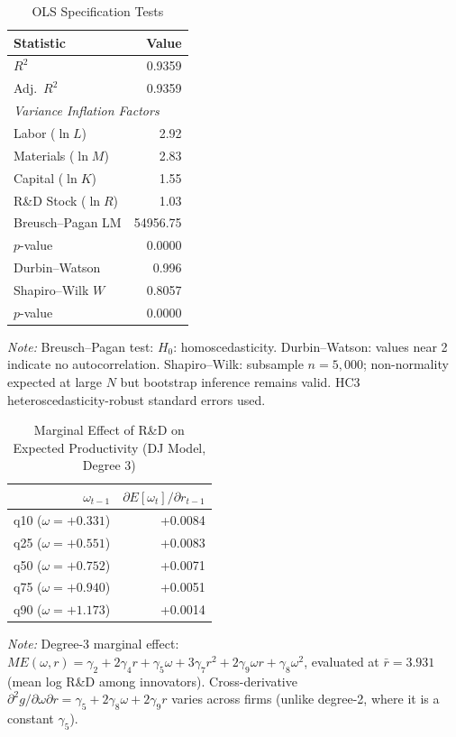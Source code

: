 \documentclass[a4paper, 12pt]{article}
\begin{document}
\begin{table}[htbp]
\centering
\caption{OLS Specification Tests}
\label{tab:ols_diagnostics}
\begin{tabular}{lr}
\toprule
Statistic & Value \\
\midrule
  $R^2$               & 0.9359 \\
  Adj.\ $R^2$         & 0.9359 \\
  \midrule
  \multicolumn{2}{l}{\textit{Variance Inflation Factors}} \\
  \quad Labor ($\ln L$) & 2.92 \\
  \quad Materials ($\ln M$) & 2.83 \\
  \quad Capital ($\ln K$) & 1.55 \\
  \quad R\&D Stock ($\ln R$) & 1.03 \\
  \midrule
  Breusch--Pagan LM & 54956.75 \\
  \quad $p$-value    & 0.0000 \\
  Durbin--Watson      & 0.996 \\
  Shapiro--Wilk $W$  & 0.8057 \\
  \quad $p$-value    & 0.0000 \\
\bottomrule
\end{tabular}
\begin{flushleft}
\footnotesize
\textit{Note:} Breusch--Pagan test: $H_0$: homoscedasticity.
Durbin--Watson: values near 2 indicate no autocorrelation.
Shapiro--Wilk: subsample $n=5{,}000$; non-normality expected
at large $N$ but bootstrap inference remains valid.
HC3 heteroscedasticity-robust standard errors used.
\end{flushleft}
\end{table}

\begin{table}[htbp]
\centering
\caption{Marginal Effect of R\&D on Expected Productivity (DJ Model, Degree 3)}
\label{tab:dj_marginal}
\begin{tabular}{rr}
\toprule
$\omega_{t-1}$ & $\partial E[\omega_t] / \partial r_{t-1}$ \\
\midrule
  q10 ($\omega = +0.331$) & +0.0084 \\
  q25 ($\omega = +0.551$) & +0.0083 \\
  q50 ($\omega = +0.752$) & +0.0071 \\
  q75 ($\omega = +0.940$) & +0.0051 \\
  q90 ($\omega = +1.173$) & +0.0014 \\
\bottomrule
\end{tabular}
\begin{flushleft}
\footnotesize
\textit{Note:} Degree-3 marginal effect:
$ME(\omega, r) = \gamma_2 + 2\gamma_4 r + \gamma_5 \omega + 3\gamma_7 r^2 + 2\gamma_9 \omega r + \gamma_8 \omega^2$,
evaluated at $\bar{r} = 3.931$ (mean log R\&D among innovators).
Cross-derivative $\partial^2 g / \partial\omega\partial r = \gamma_5 + 2\gamma_8\omega + 2\gamma_9 r$
varies across firms (unlike degree-2, where it is a constant $\gamma_5$).
\end{flushleft}
\end{table}
\end{document}
